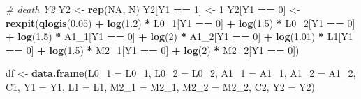\documentclass[
]{book}
\newenvironment{Shaded}{\begin{snugshade}}{\end{snugshade}}
\newcommand{\AttributeTok}[1]{\textcolor[rgb]{0.13,0.29,0.53}{#1}}
\newcommand{\CommentTok}[1]{\textcolor[rgb]{0.56,0.35,0.01}{\textit{#1}}}
\newcommand{\ConstantTok}[1]{\textcolor[rgb]{0.56,0.35,0.01}{#1}}
\newcommand{\DecValTok}[1]{\textcolor[rgb]{0.00,0.00,0.81}{#1}}
\newcommand{\FloatTok}[1]{\textcolor[rgb]{0.00,0.00,0.81}{#1}}
\newcommand{\FunctionTok}[1]{\textcolor[rgb]{0.13,0.29,0.53}{\textbf{#1}}}
\newcommand{\NormalTok}[1]{#1}
\newcommand{\OtherTok}[1]{\textcolor[rgb]{0.56,0.35,0.01}{#1}}
\newcommand{\SpecialCharTok}[1]{\textcolor[rgb]{0.81,0.36,0.00}{\textbf{#1}}}
\begin{document}
\begin{Shaded}
\begin{Highlighting}[]
  \CommentTok{\# death Y2}
\NormalTok{  Y2 }\OtherTok{\textless{}{-}} \FunctionTok{rep}\NormalTok{(}\ConstantTok{NA}\NormalTok{, N)}
\NormalTok{  Y2[Y1 }\SpecialCharTok{==} \DecValTok{1}\NormalTok{] }\OtherTok{\textless{}{-}} \DecValTok{1}
\NormalTok{  Y2[Y1 }\SpecialCharTok{==} \DecValTok{0}\NormalTok{] }\OtherTok{\textless{}{-}} \FunctionTok{rexpit}\NormalTok{(}\FunctionTok{qlogis}\NormalTok{(}\FloatTok{0.05}\NormalTok{) }\SpecialCharTok{+} \FunctionTok{log}\NormalTok{(}\FloatTok{1.2}\NormalTok{) }\SpecialCharTok{*}\NormalTok{ L0\_1[Y1 }\SpecialCharTok{==} \DecValTok{0}\NormalTok{] }\SpecialCharTok{+} 
                          \FunctionTok{log}\NormalTok{(}\FloatTok{1.5}\NormalTok{) }\SpecialCharTok{*}\NormalTok{ L0\_2[Y1 }\SpecialCharTok{==} \DecValTok{0}\NormalTok{] }\SpecialCharTok{+} 
                          \FunctionTok{log}\NormalTok{(}\FloatTok{1.5}\NormalTok{) }\SpecialCharTok{*}\NormalTok{ A1\_1[Y1 }\SpecialCharTok{==} \DecValTok{0}\NormalTok{] }\SpecialCharTok{+} \FunctionTok{log}\NormalTok{(}\DecValTok{2}\NormalTok{) }\SpecialCharTok{*}\NormalTok{ A1\_2[Y1 }\SpecialCharTok{==} \DecValTok{0}\NormalTok{] }\SpecialCharTok{+} 
                          \FunctionTok{log}\NormalTok{(}\FloatTok{1.01}\NormalTok{) }\SpecialCharTok{*}\NormalTok{ L1[Y1 }\SpecialCharTok{==} \DecValTok{0}\NormalTok{] }\SpecialCharTok{+} 
                          \FunctionTok{log}\NormalTok{(}\FloatTok{1.5}\NormalTok{) }\SpecialCharTok{*}\NormalTok{ M2\_1[Y1 }\SpecialCharTok{==} \DecValTok{0}\NormalTok{] }\SpecialCharTok{+} \FunctionTok{log}\NormalTok{(}\DecValTok{2}\NormalTok{) }\SpecialCharTok{*}\NormalTok{ M2\_2[Y1 }\SpecialCharTok{==} \DecValTok{0}\NormalTok{])  }
                               
\NormalTok{  df }\OtherTok{\textless{}{-}} \FunctionTok{data.frame}\NormalTok{(}\AttributeTok{L0\_1 =}\NormalTok{ L0\_1, }\AttributeTok{L0\_2 =}\NormalTok{ L0\_2,}
                   \AttributeTok{A1\_1 =}\NormalTok{ A1\_1, }\AttributeTok{A1\_2 =}\NormalTok{ A1\_2, C1,}
                   \AttributeTok{Y1 =}\NormalTok{ Y1, }\AttributeTok{L1 =}\NormalTok{ L1,}
                   \AttributeTok{M2\_1 =}\NormalTok{ M2\_1, }\AttributeTok{M2\_2 =}\NormalTok{ M2\_2, C2,}
                   \AttributeTok{Y2 =}\NormalTok{ Y2)}
  

\end{Highlighting}
\end{Shaded}
\end{document}

